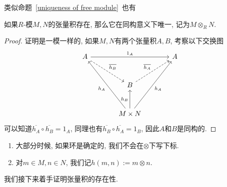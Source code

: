 类似命题~\ref{uniqueness of free module}~也有

\begin{prop}
    如果$R$-模$M,N$的张量积存在, 那么它在同构意义下唯一, 记为$M\otimes_R N$.
\end{prop}
\begin{proof}
    证明是一模一样的, 如果$M,N$有两个张量积$A,B$, 考察以下交换图
    \[\begin{tikzcd}[sep=large]
        A \arrow[rr, "1_A"] \arrow[dr, dashed, "\overline{h_B}"] & & A\\
        & B \arrow[ur, dashed, "\overline{h_A}"] &\\
        & M\times N \arrow[uul, "h_A"] \arrow[u, "h_B"] \arrow[uur, "h_A"'] &
    \end{tikzcd}\]
    可以知道$\overline{h_A}\circ\overline{h_B}=1_A$, 同理也有$\overline{h_B}\circ\overline{h_A}=1_B$, 因此$A$和$B$是同构的.
\end{proof}

\begin{sym}
    \begin{enumerate}[(1)]
        \item 大部分时候, 如果环是确定的, 我们不会在$\otimes$下写下标.
        \item 对$m\in M,n\in N$, 我们记$h(m,n):=m\otimes n$.
    \end{enumerate}
\end{sym}

我们接下来着手证明张量积的存在性.

